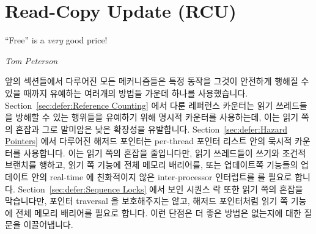 
\section{Read-Copy Update (RCU)}
\label{sec:defer:Read-Copy Update (RCU)}
%
\epigraph{``Free'' is a \emph{very} good price!}{\emph{Tom Peterson}}

앞의 섹션들에서 다루어진 모든 메커니즘들은 특정 동작을 그것이 안전하게 행해질
수 있을 때까지 유예하는 여러개의 방법들 가운데 하나를 사용했습니다.
Section~\ref{sec:defer:Reference Counting} 에서 다룬 레퍼런스 카운터는 읽기
쓰레드들을 방해할 수 있는 행위들을 유예하기 위해 명시적 카운터를 사용하는데,
이는 읽기 쪽의 혼잡과 그로 말미암은 낮은 확장성을 유발합니다.
Section~\ref{sec:defer:Hazard Pointers} 에서 다루어진 해저드 포인터는
per-thread 포인터 리스트 안의 묵시적 카운터를 사용합니다.
이는 읽기 쪽의 혼잡을 줄입니다만, 읽기 쓰레드들이 쓰기와 조건적 브랜치를
행하고, 읽기 쪽 기능에 전체 메모리 배리어를, 또는 업데이트쪽 기능들의 업데이트
안의 real-time 에 친화적이지 않은 inter-processor 인터럽트를 를 필요로 합니다.
Section~\ref{sec:defer:Sequence Locks} 에서 보인 시퀀스 락 또한 읽기 쪽의
혼잡을 막습니다만, 포인터 traversal 을 보호해주지는 않고, 해저드 포인터처럼
읽기 쪽 기능에 전체 메모리 배리어를 필요로 합니다.
이런 단점은 더 좋은 방법은 없는지에 대한 질문을 이끌어냅니다.
\iffalse

All of the mechanisms discussed in the preceding sections
used one of a number of approaches to defer specific actions
until they may be carried out safely.
The reference counters discussed in
Section~\ref{sec:defer:Reference Counting}
use explicit counters to defer actions that could disturb readers,
which results in read-side contention and thus poor scalability.
The hazard pointers covered by
Section~\ref{sec:defer:Hazard Pointers}
uses implicit counters in the guise of per-thread lists of pointer.
This avoids read-side contention, but requires readers do stores and
conditional branches, as well as either full memory barriers in read-side
primitives or real-time-unfriendly inter-processor interrupts in
update-side primitives.
The sequence lock presented in
Section~\ref{sec:defer:Sequence Locks}
also avoids read-side contention, but does not protect pointer
traversals and, like hazard pointers, requires either full memory barriers
in read-side primitives, or inter-processor interrupts in update-side
primitives.
These schemes' shortcomings raise the question of
whether it is possible to do better.
\fi

